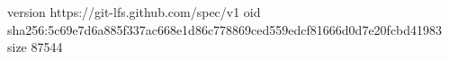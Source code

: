 version https://git-lfs.github.com/spec/v1
oid sha256:5c69e7d6a885f337ac668e1d86c778869ced559edcf81666d0d7e20fcbd41983
size 87544
